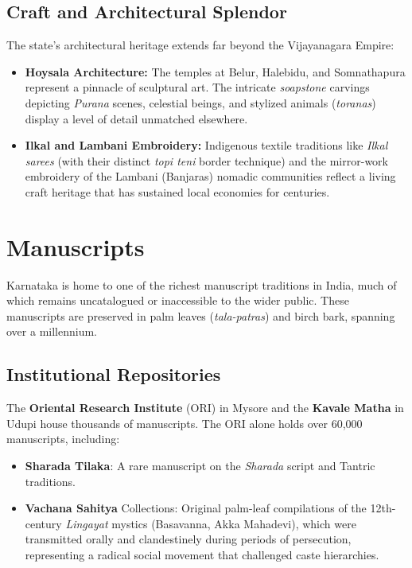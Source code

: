 \documentclass[12pt]{article}
\begin{document}
\subsection{Craft and Architectural Splendor}
The state’s architectural heritage extends far beyond the Vijayanagara Empire:
\begin{itemize}
    \item \textbf{Hoysala Architecture:} The temples at Belur, Halebidu, and Somnathapura represent a pinnacle of sculptural art. The intricate \textit{soapstone} carvings depicting \textit{Purana} scenes, celestial beings, and stylized animals (\textit{toranas}) display a level of detail unmatched elsewhere.
    \item \textbf{Ilkal and Lambani Embroidery:} Indigenous textile traditions like \textit{Ilkal sarees} (with their distinct \textit{topi teni} border technique) and the mirror-work embroidery of the Lambani (Banjaras) nomadic communities reflect a living craft heritage that has sustained local economies for centuries.
\end{itemize}

\section{Manuscripts}
Karnataka is home to one of the richest manuscript traditions in India, much of which remains uncatalogued or inaccessible to the wider public. These manuscripts are preserved in palm leaves (\textit{tala-patras}) and birch bark, spanning over a millennium.

\subsection{Institutional Repositories}
The \textbf{Oriental Research Institute} (ORI) in Mysore and the \textbf{Kavale Matha} in Udupi house thousands of manuscripts. The ORI alone holds over 60,000 manuscripts, including:
\begin{itemize}
    \item \textbf{Sharada Tilaka}: A rare manuscript on the \textit{Sharada} script and Tantric traditions.
    \item \textbf{Vachana Sahitya} Collections: Original palm-leaf compilations of the 12th-century \textit{Lingayat} mystics (Basavanna, Akka Mahadevi), which were transmitted orally and clandestinely during periods of persecution, representing a radical social movement that challenged caste hierarchies.
\end{itemize}
\end{document}
